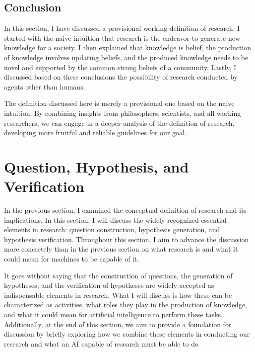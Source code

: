 \subsection{Conclusion}
In this section, I have discussed a provisional working definition of research. I started with the naive intuition that research is the endeavor to generate new knowledge for a society. I then explained that knowledge is belief, the production of knowledge involves updating beliefs, and the produced knowledge needs to be novel and supported by the common strong beliefs of a community. Lastly, I discussed based on these conclusions the possibility of research conducted by agents other than humans.

The definition discussed here is merely a provisional one based on the naive intuition. By combining insights from philosophers, scientists, and all working researchers, we can engage in a deeper analysis of the definition of research, developing more fruitful and reliable guidelines for our goal.

\section{Question, Hypothesis, and  Verification}
In the previous section, I examined the conceptual definition of research and its implications. In this section, I will discuss the widely recognized essential elements in research: question construction, hypothesis generation, and hypothesis verification. Throughout this section, I aim to advance the discussion more concretely than in the previous section on what research is and what it could mean for machines to be capable of it.

It goes without saying that the construction of questions, the generation of hypotheses, and the verification of hypotheses are widely accepted as indispensable elements in research. What I will discuss is how these can be characterized as activities, what roles they play in the production of knowledge, and what it could mean for artificial intelligence to perform these tasks. Additionally, at the end of this section, we aim to provide a foundation for discussion by briefly exploring how we combine these elements in conducting our research and what an AI capable of research must be able to do



